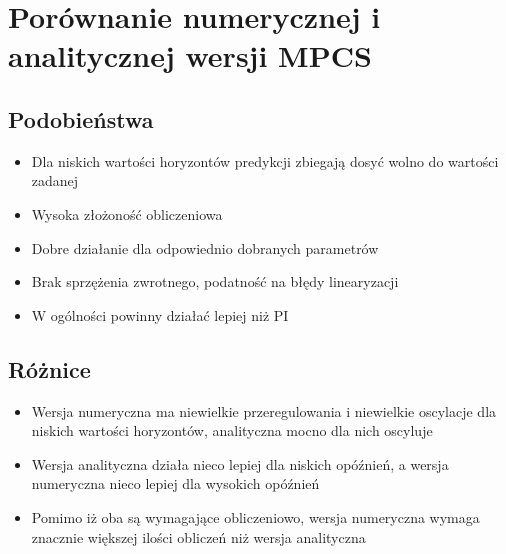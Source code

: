 \section{Porównanie numerycznej i analitycznej wersji MPCS}
\subsection{Podobieństwa}
\begin{itemize}
    \item Dla niskich wartości horyzontów predykcji zbiegają dosyć wolno do wartości zadanej
    \item Wysoka złożoność obliczeniowa
    \item Dobre działanie dla odpowiednio dobranych parametrów
    \item Brak sprzężenia zwrotnego, podatność na błędy linearyzacji
    \item W ogólności powinny działać lepiej niż PI
\end{itemize}
\subsection{Różnice}
\begin{itemize}
    \item Wersja numeryczna ma niewielkie przeregulowania i niewielkie oscylacje dla niskich wartości horyzontów, analityczna mocno dla nich oscyluje
    \item Wersja analityczna działa nieco lepiej dla niskich opóźnień, a wersja numeryczna nieco lepiej dla wysokich opóźnień
    \item Pomimo iż oba są wymagające obliczeniowo, wersja numeryczna wymaga znacznie większej ilości obliczeń niż wersja analityczna
\end{itemize}